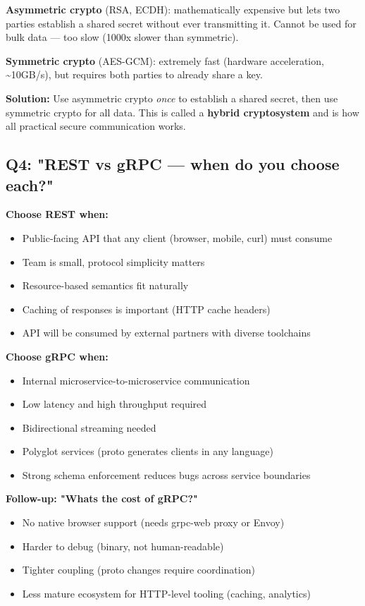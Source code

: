 \documentclass[11pt]{article}
\providecommand{\tightlist}{\setlength{\itemsep}{1pt}\setlength{\parskip}{0pt}}
\begin{document}
\textbf{Asymmetric crypto} (RSA, ECDH): mathematically expensive but lets two parties establish a shared secret without ever transmitting it. Cannot be used for bulk data --- too slow (1000x slower than symmetric).

\textbf{Symmetric crypto} (AES-GCM): extremely fast (hardware acceleration, \textasciitilde10GB/s), but requires both parties to already share a key.

\textbf{Solution:} Use asymmetric crypto \emph{once} to establish a shared secret, then use symmetric crypto for all data. This is called a \textbf{hybrid cryptosystem} and is how all practical secure communication works.

\subsection{Q4: "REST vs gRPC --- when do you choose each?"}\label{q4-rest-vs-grpc--when-do-you-choose-each}

\textbf{Choose REST when:}

\begin{itemize}
\tightlist
\item
  Public-facing API that any client (browser, mobile, curl) must consume
\item
  Team is small, protocol simplicity matters
\item
  Resource-based semantics fit naturally
\item
  Caching of responses is important (HTTP cache headers)
\item
  API will be consumed by external partners with diverse toolchains
\end{itemize}

\textbf{Choose gRPC when:}

\begin{itemize}
\tightlist
\item
  Internal microservice-to-microservice communication
\item
  Low latency and high throughput required
\item
  Bidirectional streaming needed
\item
  Polyglot services (proto generates clients in any language)
\item
  Strong schema enforcement reduces bugs across service boundaries
\end{itemize}

\textbf{Follow-up: "What\textquotesingle s the cost of gRPC?"}

\begin{itemize}
\tightlist
\item
  No native browser support (needs grpc-web proxy or Envoy)
\item
  Harder to debug (binary, not human-readable)
\item
  Tighter coupling (proto changes require coordination)
\item
  Less mature ecosystem for HTTP-level tooling (caching, analytics)
\end{itemize}
\end{document}
